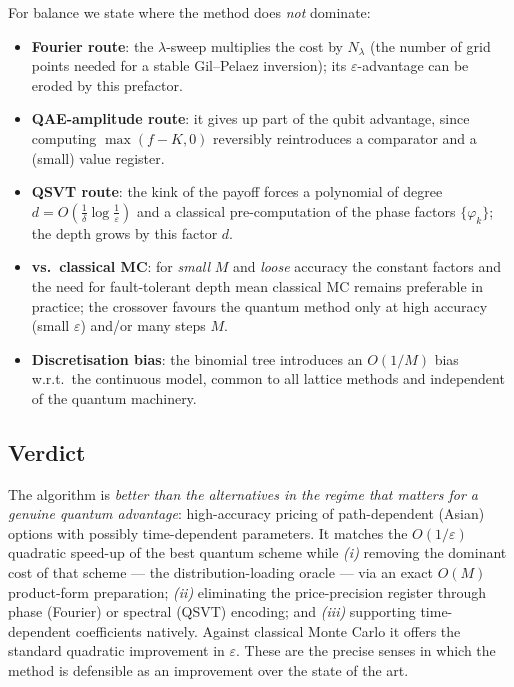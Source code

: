 \documentclass{article}
\begin{document}
For balance we state where the method does \emph{not} dominate:
\begin{itemize}
    \item \textbf{Fourier route}: the $\lambda$-sweep multiplies the cost by $N_\lambda$ (the number of grid points needed for a stable Gil--Pelaez inversion); its $\varepsilon$-advantage can be eroded by this prefactor.
    \item \textbf{QAE-amplitude route}: it gives up part of the qubit advantage, since computing $\max(f-K,0)$ reversibly reintroduces a comparator and a (small) value register.
    \item \textbf{QSVT route}: the kink of the payoff forces a polynomial of degree $d=O(\tfrac1\delta\log\tfrac1\varepsilon)$ and a classical pre-computation of the phase factors $\{\varphi_k\}$; the depth grows by this factor $d$.
    \item \textbf{vs.\ classical MC}: for \emph{small} $M$ and \emph{loose} accuracy the constant factors and the need for fault-tolerant depth mean classical MC remains preferable in practice; the crossover favours the quantum method only at high accuracy (small $\varepsilon$) and/or many steps $M$.
    \item \textbf{Discretisation bias}: the binomial tree introduces an $O(1/M)$ bias w.r.t.\ the continuous model, common to all lattice methods and independent of the quantum machinery.
\end{itemize}

\subsection{Verdict}

The algorithm is \emph{better than the alternatives in the regime that matters for a genuine quantum advantage}: high-accuracy pricing of path-dependent (Asian) options with possibly time-dependent parameters. It matches the $O(1/\varepsilon)$ quadratic speed-up of the best quantum scheme \cite{Stamatopoulos_2020} while \emph{(i)} removing the dominant cost of that scheme --- the distribution-loading oracle --- via an exact $O(M)$ product-form preparation; \emph{(ii)} eliminating the price-precision register through phase (Fourier) or spectral (QSVT) encoding; and \emph{(iii)} supporting time-dependent coefficients natively. Against classical Monte Carlo it offers the standard quadratic improvement in $\varepsilon$. These are the precise senses in which the method is defensible as an improvement over the state of the art.


%
\newpage
\printbibliography
\end{document}
